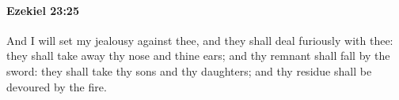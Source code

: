 
		\paragraph{Ezekiel 23:25} %
			\label{EZEKIEL-23-25}

			And I will set my jealousy against thee, and they shall deal furiously with thee: they shall take away thy nose and thine ears; and thy remnant shall fall by the sword: they shall take thy sons and thy daughters; and thy residue shall be devoured by the fire.


